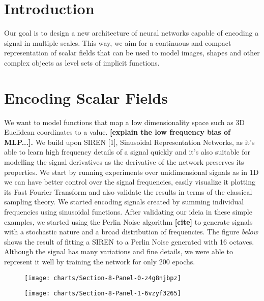 \section{Introduction}
Our goal is to design a new architecture of neural networks capable of encoding a signal in multiple scales. This way, we aim for a continuous and compact representation of scalar fields that can be used to model images, shapes and other complex objects as level sets of implicit functions.
\section{Encoding Scalar Fields}
We want to model functions that map a low dimensionality space such as 3D Euclidean coordinates to a value. \textbf{[explain the low frequency bias of MLP...].} We build upon SIREN [1], Sinusoidal Representation Networks, as it's able to learn high frequency details of a signal quickly and it's also suitable for modelling the signal derivatives as the derivative of the network preserves its properties.
We start by running experiments over unidimensional signals as in 1D we can have better control over the signal frequencies, easily visualize it plotting its Fast Fourier Transform and also validate the results in terms of the classical sampling theory. We started encoding signals created by summing individual frequencies using sinusoidal functions. After validating our ideia in these simple examples, we started using the Perlin Noise algorithm \textbf{[cite]} to generate signals with a stochastic nature and a broad distribution of frequencies. 
The figure \textit{below} shows the result of fitting a SIREN to a Perlin Noise generated with 16 octaves. Although the signal has many variations and fine details, we were able to represent it well by training the network for only 200 epochs.

\begin{figure}[!htb]
\texttt{[image: charts/Section-8-Panel-0-z4g8njbpz]}
\caption{}
\endminipage\hfill
{}
\texttt{[image: charts/Section-8-Panel-1-6vzyf3265]}
\caption{}
\endminipage
\end{figure}

